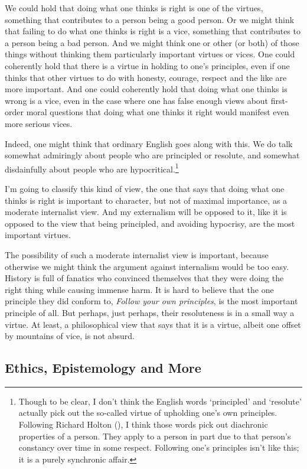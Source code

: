 \documentclass[
  10pt,
  letterpaper,
  twoside]{scrbook}
\begin{document}
We could hold that doing what one thinks is right is one of the virtues,
something that contributes to a person being a good person. Or we might
think that failing to do what one thinks is right is a vice, something
that contributes to a person being a bad person. And we might think one
or other (or both) of those things without thinking them particularly
important virtues or vices. One could coherently hold that there is a
virtue in holding to one's principles, even if one thinks that other
virtues to do with honesty, courage, respect and the like are more
important. And one could coherently hold that doing what one thinks is
wrong is a vice, even in the case where one has false enough views about
first-order moral questions that doing what one thinks it right would
manifest even more serious vices.

Indeed, one might think that ordinary English goes along with this. We
do talk somewhat admiringly about people who are principled or resolute,
and somewhat disdainfully about people who are hypocritical.\footnote{Though
  to be clear, I don't think the English words `principled' and
  `resolute' actually pick out the so-called virtue of upholding one's
  own principles. Following Richard Holton
  (), I think those words pick out
  diachronic properties of a person. They apply to a person in part due
  to that person's constancy over time in some respect. Following one's
  principles isn't like this; it is a purely synchronic affair.}

I'm going to classify this kind of view, the one that says that doing
what one thinks is right is important to character, but not of maximal
importance, as a moderate internalist view. And my externalism will be
opposed to it, like it is opposed to the view that being principled, and
avoiding hypocrisy, are the most important virtues.

The possibility of such a moderate internalist view is important,
because otherwise we might think the argument against internalism would
be too easy. History is full of fanatics who convinced themselves that
they were doing the right thing while causing immense harm. It is hard
to believe that the one principle they did conform to, \emph{Follow your
own principles}, is the most important principle of all. But perhaps,
just perhaps, their resoluteness is in a small way a virtue. At least, a
philosophical view that says that it is a virtue, albeit one offset by
mountains of vice, is not absurd.

\subsection{Ethics, Epistemology and
More}\label{ethicsepistemologyandmore}
\end{document}
